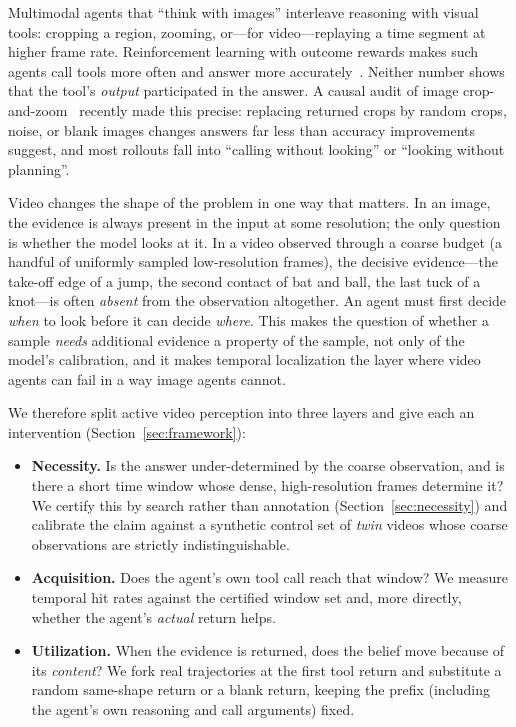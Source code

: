 \documentclass{article}
\begin{document}
Multimodal agents that ``think with images'' interleave reasoning with visual tools: cropping a region, zooming, or---for video---replaying a time segment at higher frame rate. Reinforcement learning with outcome rewards makes such agents call tools more often and answer more accurately~\citep{deepeyes2025,videosearcher2026}. Neither number shows that the tool's \emph{output} participated in the answer. A causal audit of image crop-and-zoom~\citep{illusion2026} recently made this precise: replacing returned crops by random crops, noise, or blank images changes answers far less than accuracy improvements suggest, and most rollouts fall into ``calling without looking'' or ``looking without planning''.

Video changes the shape of the problem in one way that matters. In an image, the evidence is always present in the input at some resolution; the only question is whether the model looks at it. In a video observed through a coarse budget (a handful of uniformly sampled low-resolution frames), the decisive evidence---the take-off edge of a jump, the second contact of bat and ball, the last tuck of a knot---is often \emph{absent} from the observation altogether. An agent must first decide \emph{when} to look before it can decide \emph{where}. This makes the question of whether a sample \emph{needs} additional evidence a property of the sample, not only of the model's calibration, and it makes temporal localization the layer where video agents can fail in a way image agents cannot.

We therefore split active video perception into three layers and give each an intervention (Section~\ref{sec:framework}):
\begin{itemize}
\item \textbf{Necessity.} Is the answer under-determined by the coarse observation, and is there a short time window whose dense, high-resolution frames determine it? We certify this by search rather than annotation (Section~\ref{sec:necessity}) and calibrate the claim against a synthetic control set of \emph{twin} videos whose coarse observations are strictly indistinguishable.
\item \textbf{Acquisition.} Does the agent's own tool call reach that window? We measure temporal hit rates against the certified window set and, more directly, whether the agent's \emph{actual} return helps.
\item \textbf{Utilization.} When the evidence is returned, does the belief move because of its \emph{content}? We fork real trajectories at the first tool return and substitute a random same-shape return or a blank return, keeping the prefix (including the agent's own reasoning and call arguments) fixed.
\end{itemize}
\end{document}
